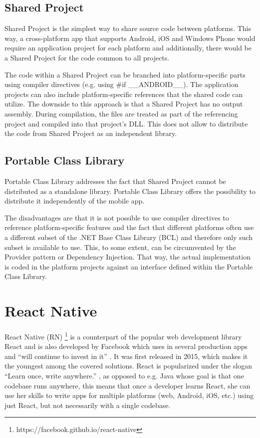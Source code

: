 \subsection{Shared Project}

Shared Project is the simplest way to share source code between platforms. This way, a cross-platform app that supports Android, iOS and Windows Phone would require an application project for each platform and additionally, there would be a Shared Project for the code common to all projects.

The code within a Shared Project can be branched into platform-specific parts using compiler directives (e.g. using \#if \_\_ANDROID\_\_). The application projects can also include platform-specific references that the shared code can utilize.
The downside to this approach is that a Shared Project has no output assembly. During compilation, the files are treated as part of the referencing project and compiled into that project's DLL. This does not allow to distribute the code from Shared Project as an independent library.

\subsection{Portable Class Library}

Portable Class Library addresses the fact that Shared Project cannot be distributed as a standalone library. Portable Class Library offers the possibility to distribute it independently of the mobile app.

The disadvantages are that it is not possible to use compiler directives to reference platform-specific features and the fact that different platforms often use a different subset of the .NET Base Class Library (BCL) and therefore only such subset is available to use. This, to some extent, can be circumvented by the Provider pattern or Dependency Injection. That way, the actual implementation is coded in the platform projects against an interface defined within the Portable Class Library.


\section{React Native}

React Native (RN) \footnote{https://facebook.github.io/react-native} is a counterpart of the popular web development library React and is also developed by Facebook which uses in several production apps and ``will continue to invest in it'' \cite{rn:invest}. It was first released in 2015, which makes it the youngest among the covered solutions. React is popularized under the slogan ``Learn once, write anywhere.'' \cite{rn:invest}, as opposed to e.g. Java whose goal is that one codebase runs anywhere, this means that once a developer learns React, she can use her skills to write apps for multiple platforms (web, Android, iOS, etc.) using just React, but not necessarily with a single codebase.

